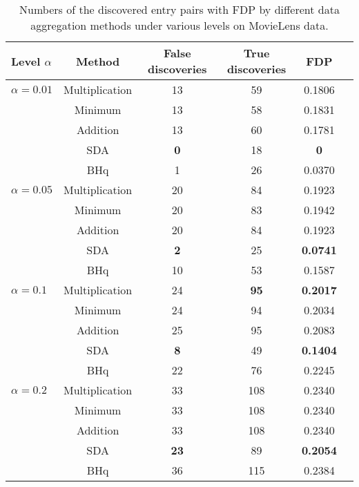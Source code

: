 \documentclass[12pt]{article}
\theoremstyle{plain}
\begin{document}
\begin{sloppypar}
\begin{table}
	\centering
	\begin{tabular}{lc|cccc}
		\hline\hline
		Level $\alpha$ & Method & False discoveries & True discoveries & FDP  \\ \hline
		$\alpha = 0.01$ & Multiplication & 13  & 59 & 0.1806  \\
		& Minimum & 13 & 58 & 0.1831 \\
		& Addition & 13 & 60 & 0.1781  \\ 
            & SDA & \textbf{0} & {18} & \textbf{0}\\ 
            & BHq & 1 & 26 & 0.0370  \\ 
  \hline
  		$\alpha = 0.05$ & Multiplication & 20  & 84 & 0.1923  \\
		& Minimum & 20 & 83 & 0.1942 \\
		& Addition & 20 & 84 & 0.1923  \\ 
            & SDA & \textbf{2} & {25} & \textbf{0.0741}\\ 
            & BHq & 10 & 53 & 0.1587  \\ 
  \hline
  		$\alpha = 0.1$ & Multiplication & 24 & \textbf{95} & \textbf{0.2017}  \\
		& Minimum & 24 & 94 & 0.2034   \\
		& Addition & 25 & 95 & 0.2083   \\ 
            & SDA & \textbf{8} & {49} & \textbf{0.1404} \\ 
            & BHq & 22 & 76 & 0.2245  \\ 
    \hline
    $\alpha = 0.2$ & Multiplication & 33 & 108 & 0.2340  \\
		& Minimum & 33 & 108 & 0.2340   \\
		& Addition & 33 & 108 & 0.2340   \\ 
            & SDA & \textbf{23} & 89 & \textbf{0.2054} \\ 
            & BHq & 36 & 115 & 0.2384 \\ 
  \hline \hline
	\end{tabular}
	\caption{Numbers of the discovered entry pairs with FDP by different data aggregation methods under various levels on MovieLens data.}
	\label{tab:tab1}
\end{table}


\end{sloppypar}
\end{document}
